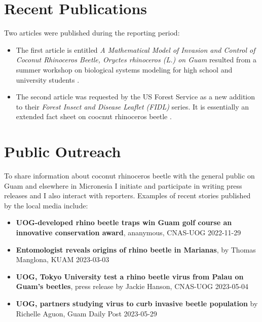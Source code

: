 \documentclass[12pt,letterpaper,english,bibliography=totocnumbered, abstract=on]{scrartcl}
\begin{document}
\section{Recent Publications}

Two articles were published during the reporting period: 
\begin{itemize}
	\item The first article is entitled \textit{A Mathematical Model of Invasion and Control of Coconut Rhinoceros Beetle, Oryctes rhinoceros (L.) on Guam} resulted from a summer workshop on biological systems modeling for high school and university students \cite{caasiMathematicalModelInvasion2023}.
	\item The second article was requested by the US Forest Service as a new addition to their \textit{Forest Insect and Disease Leaflet (FIDL)} series. It is essentially an extended fact sheet on coocnut rhinoceros beetle \cite{mooreCoconutRhinocerosBeetle2023}.
\end{itemize}


\section{Public Outreach}

To share information about coconut rhinoceros beetle with the general public on Guam and elsewhere in Micronesia I initiate and participate in writing press releases and I also interact with reporters. Examples of recent stories published by the local media include:

\begin{itemize}
	
	\item \textbf{UOG-developed rhino beetle traps win Guam golf course an innovative conservation award}, ananymous, CNAS-UOG 2022-11-29 \cite{anonymousUOGdevelopedRhinoBeetle2022}
	
	\item \textbf{Entomologist reveals origins of rhino beetle in Marianas}, by Thomas Manglona, KUAM 2023-03-03 \cite{manglonaEntomologistRevealsOrigins2023}
	
	\item \textbf{UOG, Tokyo University test a rhino beetle virus from Palau on Guam’s beetles}, press release by Jackie Hanson, CNAS-UOG 2023-05-04 \cite{hansonUOGTokyoUniversity2023}
	
	\item \textbf{UOG, partners studying virus to curb invasive beetle population} by Richelle Aguon, Guam Daily Post 2023-05-29 \cite{postUOGPartnersStudying2023}
	
\end{itemize}


%
%
%


\newpage

\printbibliography
\end{document}
